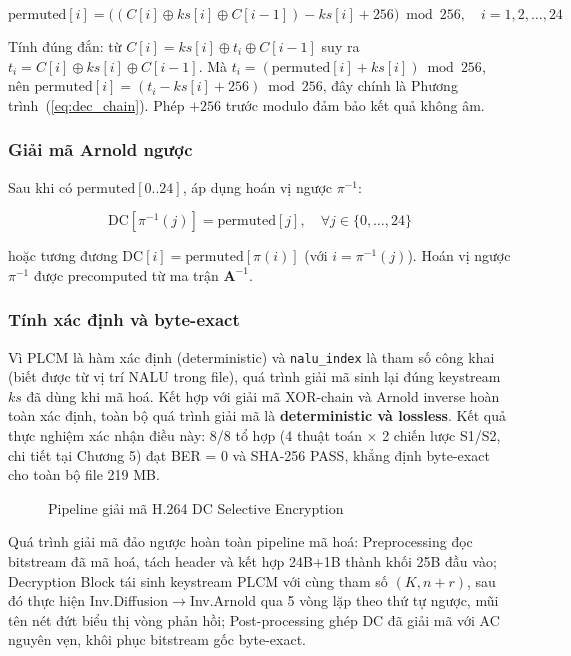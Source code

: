 \begin{equation}
\text{permuted}[i] = \bigl((C[i] \oplus ks[i] \oplus C[i-1]) - ks[i] + 256\bigr) \bmod 256, \quad i = 1, 2, \ldots, 24
\label{eq:dec_chain}
\end{equation}

Tính đúng đắn: từ $C[i] = ks[i] \oplus t_i \oplus C[i-1]$ suy ra $t_i = C[i] \oplus ks[i] \oplus C[i-1]$. Mà $t_i = (\text{permuted}[i] + ks[i]) \bmod 256$, nên $\text{permuted}[i] = (t_i - ks[i] + 256) \bmod 256$, đây chính là Phương trình~(\ref{eq:dec_chain}). Phép $+256$ trước modulo đảm bảo kết quả không âm.

\subsubsection{Giải mã Arnold ngược}

Sau khi có $\text{permuted}[0..24]$, áp dụng hoán vị ngược $\pi^{-1}$:

\begin{equation}
\text{DC}[\pi^{-1}(j)] = \text{permuted}[j], \quad \forall j \in \{0, \ldots, 24\}
\label{eq:arnold_inv}
\end{equation}

hoặc tương đương $\text{DC}[i] = \text{permuted}[\pi(i)]$ (với $i = \pi^{-1}(j)$). Hoán vị ngược $\pi^{-1}$ được precomputed từ ma trận $\mathbf{A}^{-1}$.

\subsubsection{Tính xác định và byte-exact}

Vì PLCM là hàm xác định (deterministic) và \texttt{nalu\_index} là tham số công khai (biết được từ vị trí NALU trong file), quá trình giải mã sinh lại đúng keystream $ks$ đã dùng khi mã hoá. Kết hợp với giải mã XOR-chain và Arnold inverse hoàn toàn xác định, toàn bộ quá trình giải mã là \textbf{deterministic và lossless}. Kết quả thực nghiệm xác nhận điều này: 8/8 tổ hợp (4 thuật toán $\times$ 2 chiến lược S1/S2, chi tiết tại Chương 5) đạt BER = 0 và SHA-256 PASS, khẳng định byte-exact cho toàn bộ file 219 MB.

\begin{figure}[ht]
\centering

\caption{Pipeline giải mã H.264 DC Selective Encryption}
\label{fig:pipeline_decrypt}
\end{figure}

Quá trình giải mã đảo ngược hoàn toàn pipeline mã hoá: Preprocessing đọc bitstream đã mã hoá, tách header và kết hợp 24B+1B thành khối 25B đầu vào; Decryption Block tái sinh keystream PLCM với cùng tham số $(K, n{+}r)$, sau đó thực hiện Inv.Diffusion$\to$Inv.Arnold qua 5 vòng lặp theo thứ tự ngược, mũi tên nét đứt biểu thị vòng phản hồi; Post-processing ghép DC đã giải mã với AC nguyên vẹn, khôi phục bitstream gốc byte-exact.

